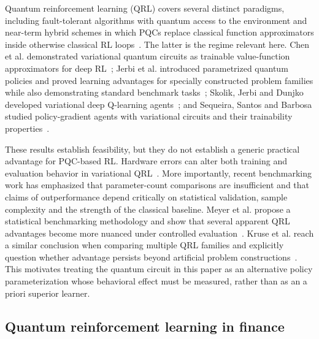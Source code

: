 \documentclass[aps,floatfix,superscriptaddress,twocolumn,tightenlines,amsmath,amssymb,nofootinbib,10pt,longbibliography,prl]{revtex4-2}
\begin{document}
Quantum reinforcement learning (QRL) covers several distinct paradigms, including
fault-tolerant algorithms with quantum access to the environment and near-term hybrid
schemes in which PQCs replace classical function approximators inside otherwise classical RL
loops~\cite{Meyer2022SurveyQuantumRL,Kaldari2025QRLReview}. The latter is the regime
relevant here. Chen et al. demonstrated variational quantum circuits as trainable
value-function approximators for deep RL~\cite{Chen2020VariationalQuantumCi}; Jerbi et al.
introduced parametrized quantum policies and proved learning advantages for specially
constructed problem families while also demonstrating standard benchmark
tasks~\cite{Jerbi2021ParametrizedQuantumP}; Skolik, Jerbi and Dunjko developed variational
deep Q-learning agents~\cite{Skolik2022QuantumagentsintheGy}; and Sequeira, Santos and
Barbosa studied policy-gradient agents with variational circuits and their trainability
properties~\cite{Sequeira2023Policygradientsusing}.

These results establish feasibility, but they do not establish a generic practical advantage
for PQC-based RL. Hardware errors can alter both training and evaluation behavior in
variational QRL~\cite{Skolik2023Robustnessofquantumr}. More importantly, recent benchmarking
work has emphasized that parameter-count comparisons are insufficient and that claims of
outperformance depend critically on statistical validation, sample complexity and the
strength of the classical baseline. Meyer et al. propose a statistical benchmarking
methodology and show that several apparent QRL advantages become more nuanced under
controlled evaluation~\cite{Meyer2025BenchmarkingQuantumR}. Kruse et al. reach a similar
conclusion when comparing multiple QRL families and explicitly question whether advantage
persists beyond artificial problem constructions~\cite{Kruse2025BenchmarkingQuantumRL}. This
motivates treating the quantum circuit in this paper as an alternative policy
parameterization whose behavioral effect must be measured, rather than as an a priori
superior learner.

\subsection{Quantum reinforcement learning in finance}
\label{subsec:bg-qrl-finance}
\end{document}
